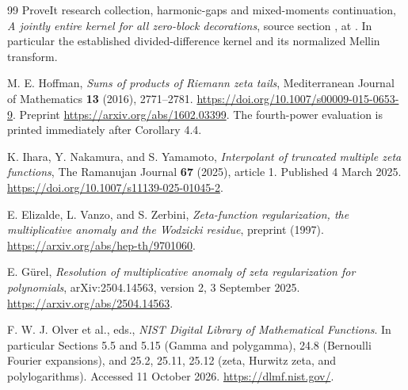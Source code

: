 \begin{thebibliography}{99}
ProveIt research collection, harmonic-gaps and mixed-moments continuation,
\emph{A jointly entire kernel for all zero-block decorations},
source section
,
at \sourcepin.  In particular the established divided-difference
kernel and its normalized Mellin transform.

M. E. Hoffman, \emph{Sums of products of Riemann zeta tails},
Mediterranean Journal of Mathematics \textbf{13} (2016), 2771--2781.
\url{https://doi.org/10.1007/s00009-015-0653-9}.
Preprint \url{https://arxiv.org/abs/1602.03399}.
The fourth-power evaluation is printed immediately after Corollary 4.4.

K. Ihara, Y. Nakamura, and S. Yamamoto,
\emph{Interpolant of truncated multiple zeta functions},
The Ramanujan Journal \textbf{67} (2025), article 1.
Published 4 March 2025.
\url{https://doi.org/10.1007/s11139-025-01045-2}.

E. Elizalde, L. Vanzo, and S. Zerbini,
\emph{Zeta-function regularization, the multiplicative anomaly and
the Wodzicki residue}, preprint (1997).
\url{https://arxiv.org/abs/hep-th/9701060}.

E. G\"urel,
\emph{Resolution of multiplicative anomaly of zeta regularization for
polynomials}, arXiv:2504.14563, version 2, 3 September 2025.
\url{https://arxiv.org/abs/2504.14563}.

F. W. J. Olver et al., eds., \emph{NIST Digital Library of Mathematical
Functions}.  In particular Sections 5.5 and 5.15 (Gamma and polygamma),
24.8 (Bernoulli Fourier expansions), and 25.2, 25.11, 25.12 (zeta,
Hurwitz zeta, and polylogarithms).  Accessed 11 October 2026.
\url{https://dlmf.nist.gov/}.

\end{thebibliography}
